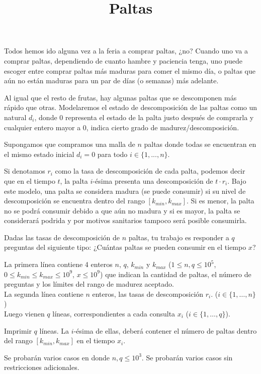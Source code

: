 \documentclass{oci}
\title{Paltas}
\begin{document}
\begin{problemDescription}
Todos hemos ido alguna vez a la feria a comprar paltas, ¿no?
Cuando uno va a comprar paltas, dependiendo de cuanto hambre y paciencia tenga, uno puede escoger entre comprar paltas más maduras para comer el mismo día, o paltas que aún no están maduras para un par de días (o semanas) más adelante.

Al igual que el resto de frutas, hay algunas paltas que se descomponen más rápido que otras. Modelaremos el estado de descomposición de las paltas como un natural $d_i$, donde 0 representa el estado de la palta justo después de comprarla y cualquier entero mayor a 0, indica cierto grado de madurez/descomposición.

Supongamos que compramos una malla de $n$ paltas donde todas se encuentran en el mismo estado inicial $d_i = 0$ para todo $i \in \{1, ..., n\}$.

Si denotamos $r_i$ como la tasa de descomposición de cada palta, podemos decir que en el tiempo $t$, la palta $i$-ésima presenta una descomposición de $t \cdot r_i$. Bajo este modelo, una palta se considera madura (se puede consumir) si su nivel de descomposición se encuentra dentro del rango $[k_{min}, k_{max}]$. Si es menor, la palta no se podrá consumir debido a que aún no madura y si es mayor, la palta se considerará podrida y por motivos sanitarios tampoco será posible consumirla.

Dadas las tasas de descomposición de $n$ paltas, tu trabajo es responder a $q$ preguntas del siguiente tipo:
¿Cuántas paltas se pueden consumir en el tiempo $x$?
\end{problemDescription}

\begin{inputDescription}
La primera línea contiene 4 enteros $n$, $q$, $k_{min}$ y $k_{max}$ ($1 \leq n, q \leq 10^5$,  $0 \leq k_{min} \leq k_{max} \leq 10^9$,  $x \leq 10^9$) que indican la cantidad de paltas, el número de preguntas y los límites del rango de madurez aceptado.\\


La segunda línea contiene $n$ enteros, las tasas de descomposición $r_i$. ($i \in \{1, \dots, n\}$)\\

Luego vienen $q$ líneas, correspondientes a cada consulta $x_i$ ($i \in \{1, \dots, q\}$).
\end{inputDescription}

\begin{outputDescription}
Imprimir $q$ líneas. La $i$-ésima de ellas, deberá contener el número de paltas dentro del rango $[k_{min}, k_{max}]$ en el tiempo $x_i$.
\end{outputDescription}

\begin{scoreDescription}
  Se probarán varios casos en donde $n, q \leq 10^3$.
  Se probarán varios casos sin restricciones adicionales.
\end{scoreDescription}

\begin{sampleDescription}
\end{sampleDescription}
\end{document}
